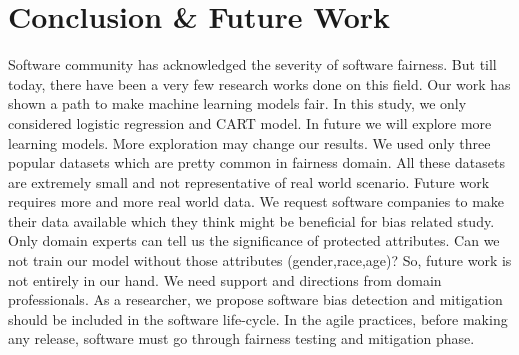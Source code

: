 \documentclass[10pt,conference]{IEEEtran}
\begin{document}
\section{Conclusion \& Future Work} Software community has acknowledged the severity of software fairness. But till today, there have been a very few research works done on this field. Our work has shown a path to make machine learning models fair. In this study, we only considered logistic regression and CART model. In future we will explore more learning models. More exploration may change our results. We used only three popular datasets which are pretty common in fairness domain. All these datasets are extremely small and not representative of real world scenario. Future work requires more and more real world data. We request software companies to make their data available which they think might be beneficial for bias related study. Only domain experts can tell us the significance of protected attributes. Can we not train our model without those attributes (gender,race,age)? So, future work is not entirely in our hand. We need support and directions from domain professionals. As a researcher, we propose software bias detection and mitigation should be included in the software life-cycle. In the agile practices, before making any release, software must go through fairness testing and mitigation phase. 





\end{document}

